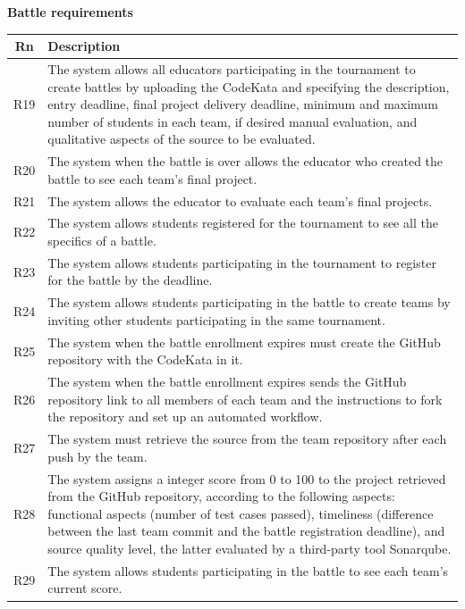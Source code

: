 \clearpage 

\textbf{Battle requirements}

\begin{tabular}{|c|p{13.2cm}|}
  \hline
  \textbf{Rn} & \textbf{Description} \\
  \hline
  R19 & The system allows all educators participating in the tournament to create battles by uploading the CodeKata and specifying the description, entry deadline, final project delivery deadline, minimum and maximum number of students in each team, if desired manual evaluation, and qualitative aspects of the source to be evaluated. \\
  \hline
  R20 & The system when the battle is over allows the educator who created the battle to see each team's final project. \\
  \hline
  R21 & The system allows the educator to evaluate each team's final projects. \\
  \hline
  R22 & The system allows students registered for the tournament to see all the specifics of a battle. \\
  \hline  
  R23 & The system allows students participating in the tournament to register for the battle by the deadline. \\
  \hline
  R24 & The system allows students participating in the battle to create teams by inviting other students participating in the same tournament. \\
  \hline
  R25 & The system when the battle enrollment expires must create the GitHub repository with the CodeKata in it. \\
  \hline
  R26 & The system when the battle enrollment expires sends the GitHub repository link to all members of each team and the instructions to fork the repository and set up an automated workflow. \\
  \hline
  R27 & The system must retrieve the source from the team repository after each push by the team. \\
  \hline
  R28 & The system assigns a integer score from 0 to 100 to the project retrieved from the GitHub repository, according to the following aspects: functional aspects (number of test cases passed), timeliness (difference between the last team commit and the battle registration deadline), and source quality level, the latter evaluated by a third-party tool Sonarqube. \\
  \hline
  R29 & The system allows students participating in the battle to see each team's current score.  \\

\end{tabular}

